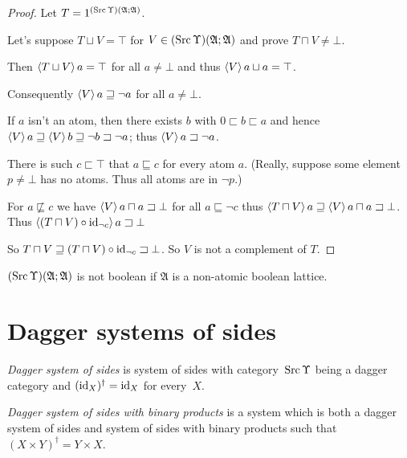 \begin{proof}
  Let $T = 1^{(\operatorname{Src}\Upsilon)(\mathfrak{A}; \mathfrak{A})}$.
  
  Let's suppose $T \sqcup V = \top$ for $V \in (\operatorname{Src}\Upsilon) (\mathfrak{A};
  \mathfrak{A})$ and prove $T \sqcap V \neq \bot$.
  
  Then $\left\langle T \sqcup V\right\rangle a = \top$ for all $a \neq \bot$ and thus $\left\langle V\right\rangle
  a \sqcup a = \top$.
  
  Consequently $\left\langle V\right\rangle a \sqsupseteq \neg a$ for all $a \neq \bot$.
  
  If $a$ isn't an atom, then there exists $b$ with $0 \sqsubset b \sqsubset a$
  and hence $\left\langle V\right\rangle a \sqsupseteq \left\langle V\right\rangle b \sqsupseteq \neg b \sqsupset \neg a$;
  thus $\left\langle V\right\rangle a \sqsupset \neg a$.
  
  There is such $c\sqsubset\top$ that $a \sqsubseteq c$ for every atom $a$. (Really,
  suppose some element $p \neq \bot$ has no atoms. Thus all atoms are in $\neg
  p$.)
  
  For $a \nsqsubseteq c$ we have $\left\langle V\right\rangle a \sqcap a \sqsupset \bot$
  for all $a \sqsubseteq \neg c$ thus $\left\langle T \sqcap V\right\rangle a \sqsupseteq
  \left\langle V\right\rangle a \sqcap a \sqsupset \bot$. Thus $\left\langle (T \sqcap V) \circ
  \operatorname{id}_{\neg c}\right\rangle a \sqsupset \bot$
  
  So $T \sqcap V \sqsupseteq (T \sqcap V) \circ \operatorname{id}_{\neg c} \sqsupset
  \bot$. So $V$ is not a complement of $T$.
\end{proof}

\begin{cor}
  $(\operatorname{Src}\Upsilon)(\mathfrak{A}; \mathfrak{A})$ is not boolean if $\mathfrak{A}$
  is a non-atomic boolean lattice.
\end{cor}

\section{Dagger systems of sides}

\begin{defn}
\emph{Dagger system of sides} is system of sides with category~$\operatorname{Src}\Upsilon$ being a dagger category
and $(\operatorname{id}_X)^\dagger = \operatorname{id}_X$ for every~$X$.
\end{defn}

\begin{defn}
\emph{Dagger system of sides with binary products} is a system which is both a dagger system of sides and system of sides with binary products
such that $(X\times Y)^\dagger = Y\times X$.
\end{defn}